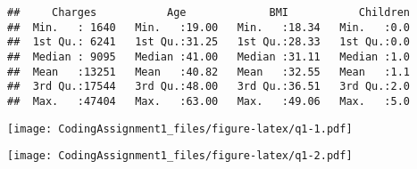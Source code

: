 \documentclass[
]{article}
\newenvironment{Shaded}{\begin{snugshade}}{\end{snugshade}}
\newcommand{\AttributeTok}[1]{\textcolor[rgb]{0.77,0.63,0.00}{#1}}
\newcommand{\CommentTok}[1]{\textcolor[rgb]{0.56,0.35,0.01}{\textit{#1}}}
\newcommand{\FunctionTok}[1]{\textcolor[rgb]{0.00,0.00,0.00}{#1}}
\newcommand{\NormalTok}[1]{#1}
\newcommand{\SpecialCharTok}[1]{\textcolor[rgb]{0.00,0.00,0.00}{#1}}
\newcommand{\StringTok}[1]{\textcolor[rgb]{0.31,0.60,0.02}{#1}}
\begin{document}
\begin{verbatim}
##     Charges           Age             BMI           Children  
##  Min.   : 1640   Min.   :19.00   Min.   :18.34   Min.   :0.0  
##  1st Qu.: 6241   1st Qu.:31.25   1st Qu.:28.33   1st Qu.:0.0  
##  Median : 9095   Median :41.00   Median :31.11   Median :1.0  
##  Mean   :13251   Mean   :40.82   Mean   :32.55   Mean   :1.1  
##  3rd Qu.:17544   3rd Qu.:48.00   3rd Qu.:36.51   3rd Qu.:2.0  
##  Max.   :47404   Max.   :63.00   Max.   :49.06   Max.   :5.0
\end{verbatim}

\begin{Shaded}
\end{Shaded}

\texttt{[image: CodingAssignment1\_files/figure-latex/q1-1.pdf]}

\begin{Shaded}
\end{Shaded}

\texttt{[image: CodingAssignment1\_files/figure-latex/q1-2.pdf]}

\begin{Shaded}
\end{Shaded}
\end{document}
